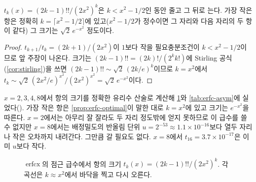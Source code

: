 \begin{proposition}
\label{prop:erfc-optimal}
$t_k(x)=(2k-1)!!/(2x^2)^k$은 $k<x^2-1/2$인 동안 줄고 그 뒤로 는다. 가장 작은 항은 정확히 $k=\lceil x^2-1/2\rceil$에 있고($x^2-1/2$가 정수이면 그 자리와 다음 자리의 두 항이 같다) 그 크기는 $\sqrt2\,e^{-x^2}$ 정도이다.
\end{proposition}

\begin{proof}
$t_{k+1}/t_k=(2k+1)/(2x^2)$이 $1$보다 작을 필요충분조건이 $k<x^2-1/2$이므로 앞 주장이 나온다. 크기는 $(2k-1)!!=(2k)!/(2^kk!)$에 Stirling 공식(\cref{cor:stirling})을 쓰면 $(2k-1)!!\sim\sqrt2\,(2k/e)^k$이므로 $k=x^2$에서 $t_k\sim\sqrt2\,(2x^2/e)^{x^2}/(2x^2)^{x^2}=\sqrt2\,e^{-x^2}$이다.
\end{proof}

$x=2,3,4,8$에서 항의 크기를 정확한 유리수 산술로 계산해 \cref{fig:erfc-terms}와 \cref{tab:erfc-asym}에 실었다(). 가장 작은 항은 \cref{prop:erfc-optimal}이 말한 대로 $k=x^2$에 있고 크기는 $e^{-x^2}$을 따른다. $x=2$에서는 아무리 잘 잘라도 두 자리 정도밖에 얻지 못하므로 이 급수를 쓸 수 없지만 $x=8$에서는 배정밀도의 반올림 단위 $u=2^{-53}\approx1.1\times10^{-16}$보다 열두 자리나 작은 오차까지 내려간다. 그만큼 갈 필요도 없다. $x=8$에서 $t_{16}=3.7\times10^{-17}$은 이미 $u$보다 작다.

\begin{figure}[htbp]
\centering
{}
\caption{$\operatorname{erfcx}$의 점근 급수에서 항의 크기 $t_k(x)=(2k-1)!!/(2x^2)^k$. 각 곡선은 $k\approx x^2$에서 바닥을 찍고 다시 오른다.}
\label{fig:erfc-terms}
\end{figure}

